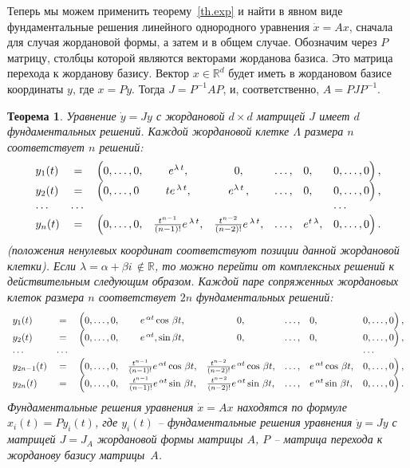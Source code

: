 \documentclass[12pt,a4paper]{article}
\newtheorem{theorem}{Теорема}
\newcommand{\re}{{\mathbb R}}
\begin{document}
Теперь мы можем применить теорему~\ref{th.exp} и найти в явном виде фундаментальные решения
линейного однородного уравнения $\dot x = Ax$, сначала для случая жордановой
формы, а затем и в общем случае. Обозначим через $P$ матрицу, столбцы которой
являются векторами жорданова базиса. Это матрица перехода к жорданову базису.
Вектор $x \in \re^d$ будет иметь в жордановом базисе координаты $y$, где $x = Py$.
Тогда $J = P^{-1}AP$, и, соответственно, $A = PJP^{-1}$.
\begin{theorem}\label{th.sol-l-jor}
Уравнение $\dot y = Jy$ с жордановой $d\times d$ матрицей $J$ имеет $d$ фундаментальных
решений. Каждой жордановой клетке $\Lambda$ размера $n$ соответствует $n$ решений:
$$
\begin{array}{lclcclll}
y_1(t) & = & \Bigl(0, \ldots , 0, & e^{\lambda \, t}, & 0 , & \ldots , & 0, & 0, \ldots , 0  \Bigr)\, , \\
y_2(t) & = & \Bigl(0, \ldots , 0&  t e^{\, \lambda \, t}, & e^{\lambda \, t\, }, & \ldots , & 0, & 0, \ldots , 0  \Bigr)\, , \\ \cdots & \cdots & {} & {} & {} & {} & {} & \cdots \\
y_n(t) & = & \Bigl(0, \ldots , 0, &\frac{t^{n-1}}{(n-1)!} e^{\, \lambda\, t},&
\frac{t^{n-2}}{(n-2)!} e^{\, \lambda \, t}, & \ldots , & e^{t\, \lambda}, & 0, \ldots , 0  \Bigr)\, .
\end{array}
$$
(положения ненулевых координат соответствуют позиции данной жордановой клетки). Если $\lambda = \alpha + \beta i\,
\notin \re$,
то можно перейти от комплексных решений к действительным следующим образом. Каждой паре сопряженных жордановых
клеток размера $n$ соответствует $2n$ фундаментальных решений:
$$
\begin{array}{lclcclll}
y_1(t) & = & \Bigl(0, \ldots , 0, & e^{\, \alpha t } \cos \, \beta t , & 0, & \ldots , & 0, & 0, \ldots , 0  \Bigr)\, , \\
y_2(t) & = & \Bigl(0, \ldots , 0, & e^{\, \alpha t}, \sin \beta t, & 0 , & \ldots , & 0, & 0, \ldots , 0  \Bigr)\, ,\\
\cdots & \cdots & {} & {} & {} & {} & {} & \cdots \\
y_{2n-1}(t) & = & \Bigl(0, \ldots , 0, & \frac{t^{n-1}}{(n-1)!} e^{\, \alpha t } \cos \, \beta t, &
\frac{t^{n-2}}{(n-2)!} e^{\, \alpha t } \cos \, \beta t, & \ldots , & e^{\, \alpha t } \cos \, \beta t, & 0, \ldots , 0  \Bigr)\, ,\\
y_{2n}(t) & = & \Bigl(0, \ldots , 0, & \frac{t^{n-1}}{(n-1)!} e^{\, \alpha t } \sin \, \beta t,&
\frac{t^{n-2}}{(n-2)!} e^{\, \alpha t } \sin \, \beta t, & \ldots , & e^{\, \alpha t }
\sin \, \beta t, & 0, \ldots , 0  \Bigr)\, .
\end{array}
$$
Фундаментальные решения уравнения $\dot x = Ax$ находятся по формуле $x_i(t) = Py_i(t)$,
где $y_i(t)$ -- фундаментальные решения уравнения $\dot y = Jy$ с матрицей $J = J_A$ жордановой
формы матрицы $A$, $P$ -- матрица перехода к жорданову базису матрицы~$A$.
\end{theorem}
\end{document}
